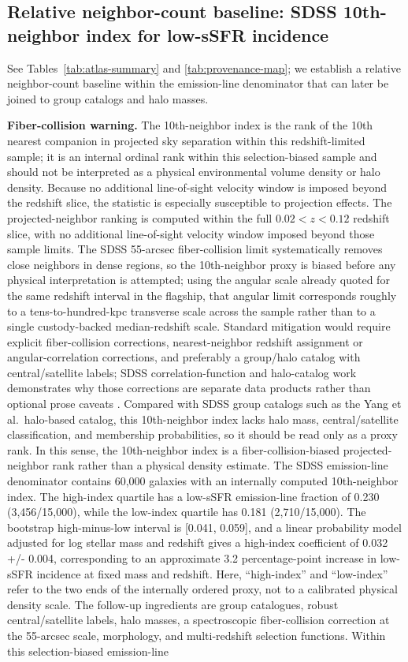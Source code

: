 \documentclass[twocolumn]{aastex631}
\begin{document}
\subsection{Relative neighbor-count baseline: SDSS 10th-neighbor index for low-sSFR incidence}
See Tables~\ref{tab:atlas-summary} and \ref{tab:provenance-map}; we establish a relative neighbor-count baseline within the emission-line denominator that can later be joined to group catalogs and halo masses. \par\noindent\textbf{Fiber-collision warning.} The 10th-neighbor index is the rank of the 10th nearest companion in projected sky separation within this redshift-limited sample; it is an internal ordinal rank within this selection-biased sample and should not be interpreted as a physical environmental volume density or halo density. Because no additional line-of-sight velocity window is imposed beyond the redshift slice, the statistic is especially susceptible to projection effects. The projected-neighbor ranking is computed within the full $0.02<z<0.12$ redshift slice, with no additional line-of-sight velocity window imposed beyond those sample limits. The SDSS 55-arcsec fiber-collision limit systematically removes close neighbors in dense regions, so the 10th-neighbor proxy is biased before any physical interpretation is attempted; using the angular scale already quoted for the same redshift interval in the flagship, that angular limit corresponds roughly to a tens-to-hundred-kpc transverse scale across the sample rather than to a single custody-backed median-redshift scale. Standard mitigation would require explicit fiber-collision corrections, nearest-neighbor redshift assignment or angular-correlation corrections, and preferably a group/halo catalog with central/satellite labels; SDSS correlation-function and halo-catalog work demonstrates why those corrections are separate data products rather than optional prose caveats \citep{zehavi2002,blanton2003,guo2012,yang2007}. Compared with SDSS group catalogs such as the Yang et al.\ halo-based catalog, this 10th-neighbor index lacks halo mass, central/satellite classification, and membership probabilities, so it should be read only as a proxy rank. In this sense, the 10th-neighbor index is a fiber-collision-biased projected-neighbor rank rather than a physical density estimate. The SDSS emission-line denominator contains 60,000 galaxies with an internally computed 10th-neighbor index. The high-index quartile has a low-sSFR emission-line fraction of 0.230 (3,456/15,000), while the low-index quartile has 0.181 (2,710/15,000). The bootstrap high-minus-low interval is [0.041, 0.059], and a linear probability model adjusted for log stellar mass and redshift gives a high-index coefficient of 0.032 +/- 0.004, corresponding to an approximate 3.2 percentage-point increase in low-sSFR incidence at fixed mass and redshift. Here, ``high-index'' and ``low-index'' refer to the two ends of the internally ordered proxy, not to a calibrated physical density scale. The follow-up ingredients are group catalogues, robust central/satellite labels, halo masses, a spectroscopic fiber-collision correction at the 55-arcsec scale, morphology, and multi-redshift selection functions. Within this selection-biased emission-line 
\end{document}
